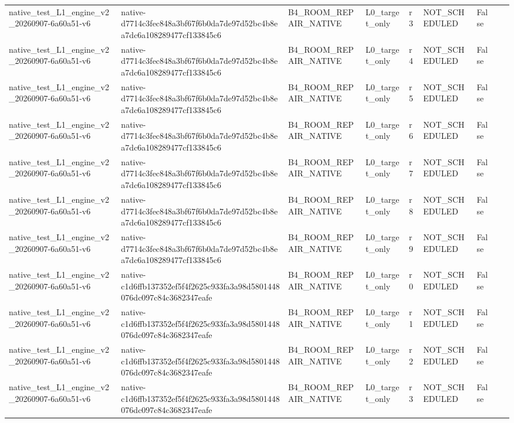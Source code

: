 \begin{tabular}{lllllllll}
native\_test\_L1\_engine\_v2\_20260907-6a60a51-v6 & native-d7714c3fec848a3bf67f6b0da7de97d52bc4b8ea7dc6a108289477cf133845c6 & B4\_ROOM\_REPAIR\_NATIVE & L0\_target\_only & r3 & NOT\_SCHEDULED & False &  &  \\
native\_test\_L1\_engine\_v2\_20260907-6a60a51-v6 & native-d7714c3fec848a3bf67f6b0da7de97d52bc4b8ea7dc6a108289477cf133845c6 & B4\_ROOM\_REPAIR\_NATIVE & L0\_target\_only & r4 & NOT\_SCHEDULED & False &  &  \\
native\_test\_L1\_engine\_v2\_20260907-6a60a51-v6 & native-d7714c3fec848a3bf67f6b0da7de97d52bc4b8ea7dc6a108289477cf133845c6 & B4\_ROOM\_REPAIR\_NATIVE & L0\_target\_only & r5 & NOT\_SCHEDULED & False &  &  \\
native\_test\_L1\_engine\_v2\_20260907-6a60a51-v6 & native-d7714c3fec848a3bf67f6b0da7de97d52bc4b8ea7dc6a108289477cf133845c6 & B4\_ROOM\_REPAIR\_NATIVE & L0\_target\_only & r6 & NOT\_SCHEDULED & False &  &  \\
native\_test\_L1\_engine\_v2\_20260907-6a60a51-v6 & native-d7714c3fec848a3bf67f6b0da7de97d52bc4b8ea7dc6a108289477cf133845c6 & B4\_ROOM\_REPAIR\_NATIVE & L0\_target\_only & r7 & NOT\_SCHEDULED & False &  &  \\
native\_test\_L1\_engine\_v2\_20260907-6a60a51-v6 & native-d7714c3fec848a3bf67f6b0da7de97d52bc4b8ea7dc6a108289477cf133845c6 & B4\_ROOM\_REPAIR\_NATIVE & L0\_target\_only & r8 & NOT\_SCHEDULED & False &  &  \\
native\_test\_L1\_engine\_v2\_20260907-6a60a51-v6 & native-d7714c3fec848a3bf67f6b0da7de97d52bc4b8ea7dc6a108289477cf133845c6 & B4\_ROOM\_REPAIR\_NATIVE & L0\_target\_only & r9 & NOT\_SCHEDULED & False &  &  \\
native\_test\_L1\_engine\_v2\_20260907-6a60a51-v6 & native-c1d6ffb137352ef5f4f2625c933fa3a98d5801448076dc097c84c3682347eafe & B4\_ROOM\_REPAIR\_NATIVE & L0\_target\_only & r0 & NOT\_SCHEDULED & False &  &  \\
native\_test\_L1\_engine\_v2\_20260907-6a60a51-v6 & native-c1d6ffb137352ef5f4f2625c933fa3a98d5801448076dc097c84c3682347eafe & B4\_ROOM\_REPAIR\_NATIVE & L0\_target\_only & r1 & NOT\_SCHEDULED & False &  &  \\
native\_test\_L1\_engine\_v2\_20260907-6a60a51-v6 & native-c1d6ffb137352ef5f4f2625c933fa3a98d5801448076dc097c84c3682347eafe & B4\_ROOM\_REPAIR\_NATIVE & L0\_target\_only & r2 & NOT\_SCHEDULED & False &  &  \\
native\_test\_L1\_engine\_v2\_20260907-6a60a51-v6 & native-c1d6ffb137352ef5f4f2625c933fa3a98d5801448076dc097c84c3682347eafe & B4\_ROOM\_REPAIR\_NATIVE & L0\_target\_only & r3 & NOT\_SCHEDULED & False &  &  \\

\end{tabular}

